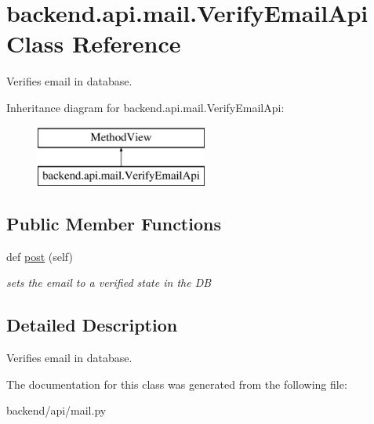 \hypertarget{classbackend_1_1api_1_1mail_1_1_verify_email_api}{}\section{backend.\+api.\+mail.\+Verify\+Email\+Api Class Reference}
\label{classbackend_1_1api_1_1mail_1_1_verify_email_api}


Verifies email in database.  


Inheritance diagram for backend.\+api.\+mail.\+Verify\+Email\+Api\+:\begin{figure}[H]
\begin{center}
\leavevmode
\includegraphics[height=2.000000cm]{classbackend_1_1api_1_1mail_1_1_verify_email_api}
\end{center}
\end{figure}
\subsection*{Public Member Functions}
\begin{DoxyCompactItemize}
\item 
\hypertarget{classbackend_1_1api_1_1mail_1_1_verify_email_api_aaa8cf616564db29bd13d90c50dc6e706}{}def \hyperlink{classbackend_1_1api_1_1mail_1_1_verify_email_api_aaa8cf616564db29bd13d90c50dc6e706}{post} (self)\label{classbackend_1_1api_1_1mail_1_1_verify_email_api_aaa8cf616564db29bd13d90c50dc6e706}

\begin{DoxyCompactList}\small\item\em sets the email to a verified state in the D\+B \end{DoxyCompactList}\end{DoxyCompactItemize}


\subsection{Detailed Description}
Verifies email in database. 

The documentation for this class was generated from the following file\+:\begin{DoxyCompactItemize}
\item 
backend/api/mail.\+py\end{DoxyCompactItemize}
